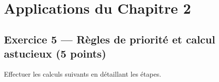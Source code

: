 \documentclass[answers]{exam}
\begin{document}
\section*{Applications du Chapitre 2}

\subsection*{Exercice 5 — Règles de priorité et calcul astucieux (5 points)}

\begin{questions}
  \question[2.5] Effectuer les calculs suivants en détaillant les étapes.
\end{questions}
\end{document}
